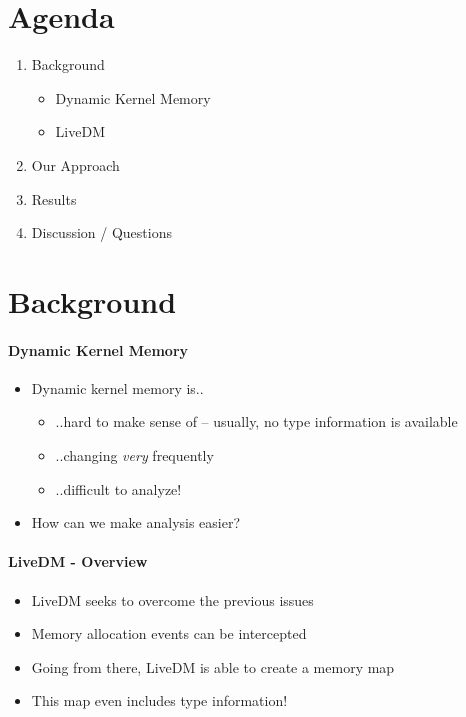 \documentclass{i20lecture}
\subtitle{LiveDM - Proof of Concept}
\begin{document}
\frame{\titlepage}

\section{Agenda}
\begin{frame}{\insertsection}
  \begin{enumerate}
   \item Background
    \begin{itemize}
        \item Dynamic Kernel Memory
        \item LiveDM
    \end{itemize}
    \item Our Approach
    \item Results
    \item Discussion / Questions
  \end{enumerate}
\end{frame}

\section{Background}
\begin{frame}{\insertsection}
  \framesubtitle{Dynamic Kernel Memory}
  
  \begin{itemize}
    \item Dynamic kernel memory is..
    \begin{itemize}
\pause
    \item ..hard to make sense of -- usually, no type information is available
\pause
    \item ..changing \textit{very} frequently
\pause
    \item ..difficult to analyze!
    \end{itemize}
\pause
    \item How can we make analysis easier?
  \end{itemize}
\end{frame}

\begin{frame}{\insertsection}
  \framesubtitle{LiveDM - Overview}
  
  \begin{itemize}
    \item LiveDM seeks to overcome the previous issues
\pause
    \item Memory allocation events can be intercepted
\pause
    \item Going from there, LiveDM is able to create a memory map
\pause
    \item This map even includes type information!
  \end{itemize}
\end{frame}
\end{document}
